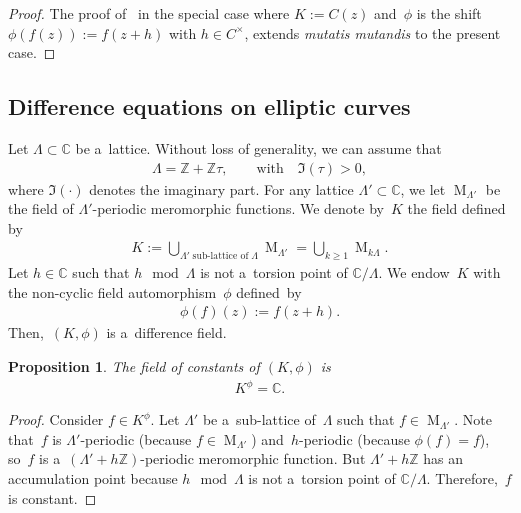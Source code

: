 \documentclass[10pt,a4paper]{amsart}
\numberwithin{equation}{section}
\newtheorem{Proposition}[Theorem]{Proposition}
{ \theoremstyle{definition}
\newtheorem{Definition}[Theorem]{Definition}
\newtheorem{Remark}[Theorem]{Remark} }
\begin{document}
\begin{proof}
The proof of~\cite[Propositions~1.20 and~1.21]{VdPS97} in the special case where $K:=C(z)$ and~$\phi$ is the shift
$\phi(f(z)):=f(z+h)$ with $h \in C^\times$, extends {\it mutatis mutandis} to the present case.
\end{proof}

\subsection{Dif\/ference equations on elliptic curves}

Let $\Lambda \subset \mathbb C$ be a~lattice.
Without loss of generality, we can assume that
\begin{gather*}
\Lambda=\mathbb Z +\mathbb Z \tau, \qquad \text{with} \quad \Im (\tau)>0,
\end{gather*}
where $\Im(\cdot)$ denotes the imaginary part.
For any lattice $\Lambda' \subset \mathbb C$, we let $\operatorname{M}_{\Lambda'}$ be the f\/ield of $\Lambda'$-periodic
meromorphic functions.
We denote by~$K$ the f\/ield def\/ined by
\begin{gather*}
K:= \bigcup_{\Lambda' \; \text{sub-lattice of} \; \Lambda} \operatorname{M}_{\Lambda'} =\bigcup_{k \geq 1} \operatorname{M}_{k  \Lambda}.
\end{gather*}
Let $h \in \mathbb C$ such that $h \mod \Lambda$ is not a~torsion point of $\mathbb C/\Lambda$.
We endow~$K$ with the non-cyclic f\/ield automorphism~$\phi$ def\/ined~by
\begin{gather*}
\phi(f)(z):=f(z+h).
\end{gather*}
Then,~$(K,\phi)$ is a~dif\/ference f\/ield.

\begin{Proposition}
The field of constants of $(K,\phi)$ is
\begin{gather*}
K^{\phi}=\mathbb C.
\end{gather*}
\end{Proposition}

\begin{proof}
Consider $f\in K^{\phi}$.
Let $\Lambda'$ be a~sub-lattice of~$\Lambda$ such that $f \in \operatorname{M}_{\Lambda'}$.
Note that~$f$ is $\Lambda'$-periodic (because $f \in \operatorname{M}_{\Lambda'}$) and~$h$-periodic (because
$\phi(f)=f$), so~$f$ is a~$(\Lambda' + h\mathbb Z)$-periodic meromorphic function.
But $\Lambda' + h\mathbb Z$ has an accumulation point because $h \mod \Lambda$ is not a~torsion point of $\mathbb
C/\Lambda$.
Therefore,~$f$ is constant.
\end{proof}
\end{document}
